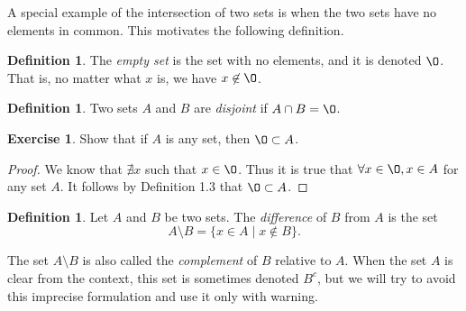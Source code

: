 \documentclass[12pt]{article}
\renewcommand{\emptyset}{\O}
\theoremstyle{definition}
\newtheorem{definition}[theorem]{Definition}
\newtheorem{exercise}[theorem]{Exercise}
\numberwithin{equation}{subsection}
\begin{document}
A special example of the intersection of two sets is when the two sets have no elements in common.
This motivates the following definition.

\begin{definition}  
The \emph{empty set} is the set with no elements, and it is denoted $\emptyset$.  That is,
no matter what $x$ is, we have $x\not\in \emptyset$.
\end{definition}  

\begin{definition}  
Two sets $A$ and $B$ are \emph{disjoint} if $A\cap B=\emptyset$.
\end{definition}  

\begin{exercise}  
Show that if $A$ is any set, then $\emptyset\subset A$.
\end{exercise}
\begin{proof}
We know that $\nexists x$ such that $x \in \emptyset$.  Thus it is true that $\forall x \in \emptyset, x\in A$ for any set $A$. It follows by Definition 1.3 that $\emptyset \subset A$.
\end{proof}

\begin{definition}  
Let $A$ and $B$ be two sets. 
The \emph{difference} of $B$ from $A$ is the set
\[
A \setminus B = \{ x \in A \mid x \notin B \}.
\]
\end{definition}

The set $A \setminus B$ is also called the \emph{complement} of $B$ relative to $A$.
When the set $A$ is clear from the context, this set is sometimes denoted $B^{c}$, but we will 
try to avoid this imprecise formulation and use it only with warning.
\end{document}
